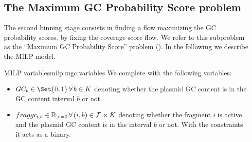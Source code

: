 \subsection{The Maximum GC Probability Score problem \MGC{}}\label{sec:method:mgc}

The second binning stage consists in finding a flow maximizing the GC probability scores, by fixing the coverage score flow.
We refer to this subproblem as the \enquote{Maximum GC Probability Score} problem (\MGC{}).
In the following we describe the MILP model.

\begin{definition}{\MGC{} MILP variables}{milp:mgc:variables}
  We complete  with the following variables:
  \begin{itemize}
    \item \(GC_b \in \Set{0, 1} \, \forall b \in K\) denoting whether the plasmid GC content is in the GC content interval \(b\) or not.
    \item \(\fraggc{i}{b} \in \Reals_{>=0} \, \forall (i, b) \in \Fragments{} \times K\) denoting whether the fragment \(i\) is active and the plasmid GC content is in the interval \(b\) or not. With the constraints it acts as a binary.
  \end{itemize}
\end{definition}

